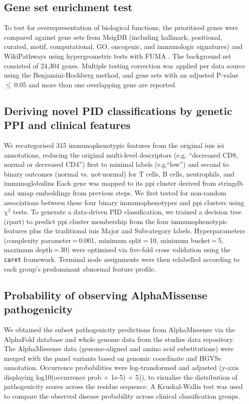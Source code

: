 \subsection{Gene set enrichment test}

To test for overrepresentation of biological functions, the prioritised genes were compared against gene sets from MsigDB (including hallmark, positional, curated, motif, computational, GO, oncogenic, and immunologic signatures) and WikiPathways using hypergeometric tests with FUMA \cite{watanabe_functional_2017, liberzon_molecular_2011}.
The background set consisted of 24,304 genes. Multiple testing correction was applied per data source using the Benjamini-Hochberg method, and gene sets with an adjusted P-value $\le$ 0.05 and more than one overlapping gene are reported.

\subsection{Deriving novel PID classifications by genetic PPI and clinical features}
We recategorised 315 immunophenotypic features from the original \ac{iuis} \ac{iei} annotations, reducing the original multi-level descriptors (e.g. ``decreased CD8, normal or decreased CD4'') first to 
minimal labels (e.g.``low'') and second to binary outcomes (normal vs. not-normal) for T cells, B cells, neutrophils, and immunoglobulins %
Each gene was mapped to its \ac{ppi} cluster derived from \ac{stringdb} and \ac{umap} embeddings from previous steps. 
We first tested for non-random associations between these four binary immunophenotypes and \ac{ppi} clusters using $\chi^2$ tests. %
To generate a data-driven PID classification, we trained a decision tree (rpart) to predict \ac{ppi} cluster membership from the four immunophenotypic features plus the traditional \ac{iuis} Major and Subcategory labels. 
Hyperparameters (complexity parameter = 0.001, minimum split = 10, minimum bucket = 5, maximum depth = 30) were optimised via five-fold cross validation using the \texttt{caret} framework. 
Terminal node assignments were then relabelled according to each group’s predominant abnormal feature profile.

\subsection{Probability of observing AlphaMissense pathogenicity}
We obtained the subset pathogenicity predictions from AlphaMissense via the AlphaFold database and whole genome data from the studies data repository\cite{cheng_accurate_2023, jun_cheng_2023_8208688}. 
The AlphaMissense data (genome-aligned and amino acid substitutions) were merged with the panel variants based on genomic coordinate and HGVSc annotation. 
Occurrence probabilities were log-transformed and adjusted (y-axis displaying log10(occurrence prob + 1e-5) + 5)), to visualise the distribution of pathogenicity scores across the residue sequence. 
A Kruskal-Wallis test was used to compare the observed disease probability across clinical classification groups.

